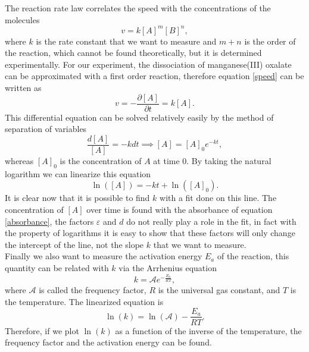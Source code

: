 \documentclass[a4paper,10pt]{article}
\begin{document}
The reaction rate law correlates the speed with the concentrations of the molecules
\begin{equation}\label{speed}v = k [A]^m [B]^n,\end{equation}
where $k$ is the rate constant that we want to measure and $m+n$ is the order of the reaction, which cannot be found theoretically, but it is determined experimentally. For our experiment, the dissociation of manganese(III) oxalate can be approximated with a first order reaction, therefore equation \eqref{speed} can be written as
\begin{equation}v = -\frac{\partial[A]}{\partial t} = k [A].\end{equation}
This differential equation can be solved relatively easily by the method of separation of variables
\begin{equation}\frac{d[A]}{[A]} = -kdt \implies [A] = [A]_0 e^{-kt},\end{equation}
whereas $[A]_0$ is the concentration of $A$ at time 0. By taking the natural logarithm we can linearize this equation
\begin{equation}\ln([A]) = -kt + \ln([A]_0).\end{equation}
It is clear now that it is possible to find $k$ with a fit done on this line. The concentration of $[A]$ over time is found with the absorbance of equation \eqref{absorbance}, the factors $\varepsilon$ and $d$ do not really play a role in the fit, in fact with the property of logarithms it is easy to show that these factors will only change the intercept of the line, not the slope $k$ that we want to measure.\\
Finally we also want to measure the activation energy $E_a$ of the reaction, this quantity can be related with $k$ via the Arrhenius equation
\begin{equation}k = \mathcal{A} e^{-\frac{E_a}{RT}},\end{equation}
where $\mathcal{A}$ is called the frequency factor, $R$ is the universal gas constant, and $T$ is the temperature. The linearized equation is
\begin{equation}\ln(k) = \ln(\mathcal{A}) - \frac{E_a}{RT}.\end{equation}
Therefore, if we plot $\ln(k)$ as a function of the inverse of the temperature, the frequency factor and the activation energy can be found.
\end{document}
